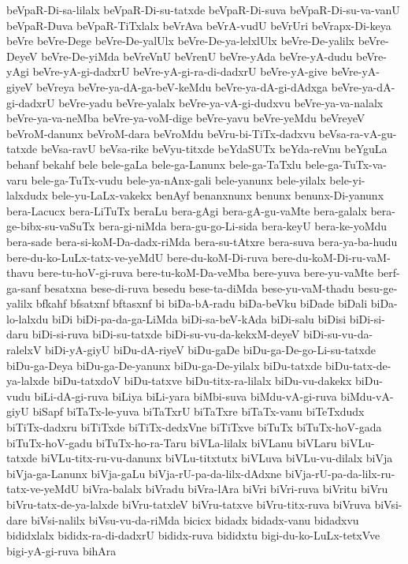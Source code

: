 {beVpaR-Di-sa-lilalx
beVpaR-Di-su-tatxde
beVpaR-Di-suva
beVpaR-Di-su-va-vanU
beVpaR-Duva
beVpaR-TiTxlalx
beVrAva
beVrA-vudU
beVrUri
beVrapx-Di-keya
beVre
beVre-Dege
beVre-De-yalUlx
beVre-De-ya-lelxlUlx
beVre-De-yalilx
beVre-DeyeV
beVre-De-yiMda
beVreVnU
beVrenU
beVre-yAda
beVre-yA-dudu
beVre-yAgi
beVre-yA-gi-dadxrU
beVre-yA-gi-ra-di-dadxrU
beVre-yA-give
beVre-yA-giyeV
beVreya
beVre-ya-dA-ga-beV-keMdu
beVre-ya-dA-gi-dAdxga
beVre-ya-dA-gi-dadxrU
beVre-yadu
beVre-yalalx
beVre-ya-vA-gi-dudxvu
beVre-ya-va-nalalx
beVre-ya-va-neMba
beVre-ya-voM-dige
beVre-yavu
beVre-yeMdu
beVreyeV
beVroM-danunx
beVroM-dara
beVroMdu
beVru-bi-TiTx-dadxvu
beVsa-ra-vA-gu-tatxde
beVsa-ravU
beVsa-rike
beVyu-titxde
beYdaSUTx
beYda-reVnu
beYguLa
behanf
bekahf
bele
bele-gaLa
bele-ga-Lanunx
bele-ga-TaTxlu
bele-ga-TuTx-va-varu
bele-ga-TuTx-vudu
bele-ya-nAnx-gali
bele-yanunx
bele-yilalx
bele-yi-lalxdudx
bele-yu-LaLx-vakekx
benAyf
benanxnunx
benunx
benunx-Di-yanunx
bera-Lacucx
bera-LiTuTx
beraLu
bera-gAgi
bera-gA-gu-vaMte
bera-galalx
bera-ge-bibx-su-vaSuTx
bera-gi-niMda
bera-gu-go-Li-sida
bera-keyU
bera-ke-yoMdu
bera-sade
bera-si-koM-Da-dadx-riMda
bera-su-tAtxre
bera-suva
bera-ya-ba-hudu
bere-du-ko-LuLx-tatx-ve-yeMdU
bere-du-koM-Di-ruva
bere-du-koM-Di-ru-vaM-thavu
bere-tu-hoV-gi-ruva
bere-tu-koM-Da-veMba
bere-yuva
bere-yu-vaMte
berf-ga-sanf
besatxna
bese-di-ruva
besedu
bese-ta-diMda
bese-yu-vaM-thadu
besu-ge-yalilx
bfkahf
bfsatxnf
bftasxnf
bi
biDa-bA-radu
biDa-beVku
biDade
biDali
biDa-lo-lalxdu
biDi
biDi-pa-da-ga-LiMda
biDi-sa-beV-kAda
biDi-salu
biDisi
biDi-si-daru
biDi-si-ruva
biDi-su-tatxde
biDi-su-vu-da-kekxM-deyeV
biDi-su-vu-da-ralelxV
biDi-yA-giyU
biDu-dA-riyeV
biDu-gaDe
biDu-ga-De-go-Li-su-tatxde
biDu-ga-Deya
biDu-ga-De-yanunx
biDu-ga-De-yilalx
biDu-tatxde
biDu-tatx-de-ya-lalxde
biDu-tatxdoV
biDu-tatxve
biDu-titx-ra-lilalx
biDu-vu-dakekx
biDu-vudu
biLi-dA-gi-ruva
biLiya
biLi-yara
biMbi-suva
biMdu-vA-gi-ruva
biMdu-vA-giyU
biSapf
biTaTx-le-yuva
biTaTxrU
biTaTxre
biTaTx-vanu
biTeTxdudx
biTiTx-dadxru
biTiTxde
biTiTx-dedxVne
biTiTxve
biTuTx
biTuTx-hoV-gada
biTuTx-hoV-gadu
biTuTx-ho-ra-Taru
biVLa-lilalx
biVLanu
biVLaru
biVLu-tatxde
biVLu-titx-ru-vu-danunx
biVLu-titxtutx
biVLuva
biVLu-vu-dilalx
biVja
biVja-ga-Lanunx
biVja-gaLu
biVja-rU-pa-da-lilx-dAdxne
biVja-rU-pa-da-lilx-ru-tatx-ve-yeMdU
biVra-balalx
biVradu
biVra-lAra
biVri
biVri-ruva
biVritu
biVru
biVru-tatx-de-ya-lalxde
biVru-tatxleV
biVru-tatxve
biVru-titx-ruva
biVruva
biVsi-dare
biVsi-nalilx
biVsu-vu-da-riMda
bicicx
bidadx
bidadx-vanu
bidadxvu
bididxlalx
bididx-ra-di-dadxrU
bididx-ruva
bididxtu
bigi-du-ko-LuLx-tetxVve
bigi-yA-gi-ruva
bihAra
}
